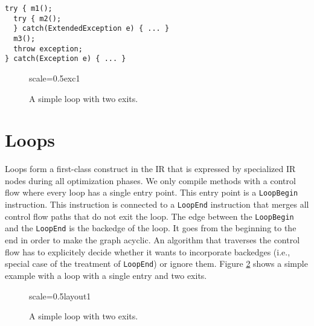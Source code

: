 \documentclass[twocolumn]{svjour3}
\newcommand\nodename[1]{\texttt{#1}}
\begin{document}
\begin{lstlisting}[label=lst:exc1, caption=Exception dispatch in the compiler graph., captionpos=b]
try { m1();
  try { m2();
  } catch(ExtendedException e) { ... }
  m3();
  throw exception;
} catch(Exception e) { ... }
\end{lstlisting}

\begin{figure}[h]
  \centering
\begin{digraphenv}{scale=0.5}{exc1}
\end{digraphenv}
  \caption{A simple loop with two exits.}
  \label{fig:exc1}
\end{figure}

\section{Loops}
\label{sec:loops}
Loops form a first-class construct in the IR that is expressed by specialized IR nodes during all optimization phases.
We only compile methods with a control flow where every loop has a single entry point.
This entry point is a \nodename{LoopBegin} instruction.
This instruction is connected to a \nodename{LoopEnd} instruction that merges all control flow paths that do not exit the loop.
The edge between the \nodename{LoopBegin} and the \nodename{LoopEnd} is the backedge of the loop.
It goes from the beginning to the end in order to make the graph acyclic.
An algorithm that traverses the control flow has to explicitely decide whether it wants to incorporate backedges (i.e., special case of the treatment of \nodename{LoopEnd}) or ignore them.
Figure \ref{fig:loop1} shows a simple example with a loop with a single entry and two exits.

\begin{figure}[h]
  \centering
\begin{digraphenv}{scale=0.5}{layout1}
\end{digraphenv}
  \caption{A simple loop with two exits.}
  \label{fig:loop1}
\end{figure}
\end{document}
